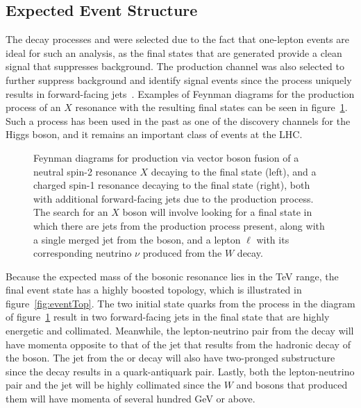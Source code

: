 \subsection{Expected Event Structure}
\label{subsec:expEvent}

The decay processes \XtoWVtolnuqqbarpr and \XtoWHtolnubbbar were selected due to the fact that one-lepton events are ideal for such an analysis, as the final states that are generated provide a clean signal that suppresses background.
The \VBF production channel was also selected to further suppress background and identify signal events since the \VBF process uniquely results in forward-facing jets~\cite{rauch2016vectorboson}.
Examples of Feynman diagrams for the \VBF production process of an $X$ resonance with the resulting final states can be seen in figure~\ref{fig:vbfFeynman}.
Such a process has been used in the past as one of the discovery channels for the Higgs boson, and it remains an important class of events at the LHC.

\begin{figure}[htbp]
  \centering
  
  \caption{
    Feynman diagrams for production via vector boson fusion of a neutral spin-2 resonance $X$ decaying to the final state \lnuqqbarpr (left), and a charged spin-1 resonance decaying to the final state \lnubbbar (right), both with additional forward-facing jets due to the \VBF production process.
    The search for an $X$ boson will involve looking for a final state in which there are jets from the \VBF production process present, along with a single merged jet from the \VorH boson, and a lepton $\ell$ with its corresponding neutrino $\nu$ produced from the $W$ decay.
  }
  \label{fig:vbfFeynman}
\end{figure}

Because the expected mass of the bosonic resonance lies in the TeV range, the final event state has a highly boosted topology, which is illustrated in figure~\ref{fig:eventTop}.
The two initial state quarks from the \VBF process in the diagram of figure~\ref{fig:vbfFeynman} result in two forward-facing jets in the final state that are highly energetic and collimated.
Meanwhile, the lepton-neutrino pair from the \Wtolnu decay will have momenta opposite to that of the jet that results from the hadronic decay of the \VorH boson.
The jet from the \Vtoqqbarpr or \Htobbbar decay will also have two-pronged substructure since the decay results in a quark-antiquark pair.
Lastly, both the lepton-neutrino pair and the jet will be highly collimated since the $W$ and \VorH bosons that produced them will have momenta of several hundred GeV or above.

